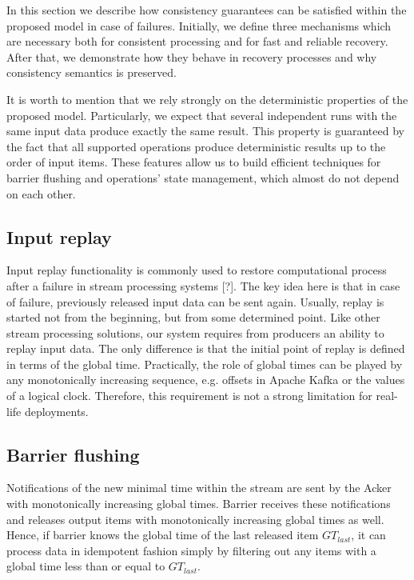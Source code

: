 
\label {fs-consistency-seciton}

In this section we describe how consistency guarantees can be satisfied within the proposed model in case of failures. Initially, we define three mechanisms which are necessary both for consistent processing and for fast and reliable recovery. After that, we demonstrate how they behave in recovery processes and why consistency semantics is preserved.

It is worth to mention that we rely strongly on the deterministic properties of the proposed model. Particularly, we expect that several independent runs with the same input data produce exactly the same result. This property is guaranteed by the fact that all supported operations produce deterministic results up to the order of input items. These features allow us to build efficient techniques for barrier flushing and operations' state management, which almost do not depend on each other.  

\subsection{Input replay}
Input replay functionality is commonly used to restore computational process after a failure in stream processing systems [?]. The key idea here is that in case of failure, previously released input data can be sent again. Usually, replay is started not from the beginning, but from some determined point. Like other stream processing solutions, our system requires from producers an ability to replay input data. The only difference is that the initial point of replay is defined in terms of the global time. Practically, the role of global times can be played by any monotonically increasing sequence, e.g. offsets in Apache Kafka or the values of a logical clock. Therefore, this requirement is not a strong limitation for real-life deployments.

\subsection{Barrier flushing}
Notifications of the new minimal time within the stream are sent by the Acker with monotonically increasing global times. Barrier receives these notifications and releases output items with monotonically increasing global times as well. Hence, if barrier knows the global time of the last released item $GT_{last}$, it can process data in idempotent fashion simply by filtering out any items with a global time less than or equal to $GT_{last}$. 

